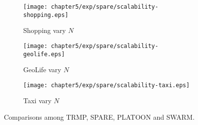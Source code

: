 \begin{figure}
\begin{subfigure}[b]{0.32\textwidth}
        \texttt{[image: chapter5/exp/spare/scalability-shopping.eps]}
        \caption{Shopping vary $N$}
    \end{subfigure} 
    \begin{subfigure}[b]{0.32\textwidth}
        \texttt{[image: chapter5/exp/spare/scalability-geolife.eps]}
        \caption{GeoLife vary $N$}
    \end{subfigure} 
    \begin{subfigure}[b]{0.32\textwidth}
        \texttt{[image: chapter5/exp/spare/scalability-taxi.eps]}
        \caption{Taxi vary $N$}
    \end{subfigure} 
 \caption{Comparisons among TRMP, SPARE, PLATOON and SWARM.}
 \label{exp:scalability}
\end{figure}
